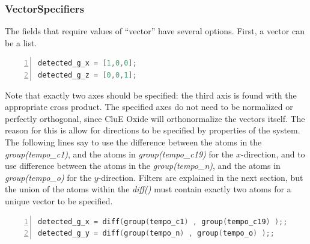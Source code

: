 \documentclass{book}
\begin{document}
\subsubsection{VectorSpecifiers} %
The fields that require values of ``vector'' have several options.
First, a vector can be a list.
\begin{lstlisting}[frame=single,numbers=left,language=c]
detected_g_x = [1,0,0];
detected_g_z = [0,0,1];
\end{lstlisting}
Note that exactly two axes should be specified: 
the third axis is found with the appropriate cross product.  
The specified axes do not need to be normalized or perfectly orthogonal, 
since CluE Oxide will orthonormalize the vectors itself.  
The reason for this is allow for directions to be specified by properties of
the system.    
The following lines say to use the difference between the atoms in the
\textit{group(tempo\_c1)}, and the atoms in \textit{group(tempo\_c19)} 
for the $x$-direction,
and to use difference between the atoms in the
\textit{group(tempo\_n)}, and the atoms in \textit{group(tempo\_o)} 
for the $y$-direction.
Filters are explained in the next section, but the union of the atoms within
the \textit{diff()} must contain exactly two atoms for a unique vector to
be specified.
\begin{lstlisting}[frame=single,numbers=left,language=c]
detected_g_x = diff(group(tempo_c1) , group(tempo_c19) );;
detected_g_y = diff(group(tempo_n) , group(tempo_o) );;
\end{lstlisting}
\end{document}
